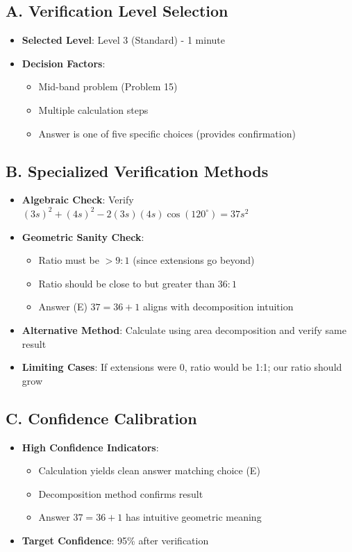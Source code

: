 \documentclass[11pt]{article}
\begin{document}
\begin{verificationbox}
\subsection*{A. Verification Level Selection}
\begin{itemize}[leftmargin=*]
    \item \textbf{Selected Level}: Level 3 (Standard) - 1 minute
    \item \textbf{Decision Factors}:
    \begin{itemize}
        \item Mid-band problem (Problem 15)
        \item Multiple calculation steps
        \item Answer is one of five specific choices (provides confirmation)
    \end{itemize}
\end{itemize}

\subsection*{B. Specialized Verification Methods}
\begin{itemize}[leftmargin=*]
    \item \textbf{Algebraic Check}: Verify $(3s)^2 + (4s)^2 - 2(3s)(4s)\cos(120^{\circ}) = 37s^2$
    \item \textbf{Geometric Sanity Check}: 
    \begin{itemize}
        \item Ratio must be $> 9:1$ (since extensions go beyond)
        \item Ratio should be close to but greater than $36:1$
        \item Answer (E) $37 = 36 + 1$ aligns with decomposition intuition
    \end{itemize}
    \item \textbf{Alternative Method}: Calculate using area decomposition and verify same result
    \item \textbf{Limiting Cases}: If extensions were 0, ratio would be 1:1; our ratio should grow
\end{itemize}

\subsection*{C. Confidence Calibration}
\begin{itemize}[leftmargin=*]
    \item \textbf{High Confidence Indicators}:
    \begin{itemize}
        \item Calculation yields clean answer matching choice (E)
        \item Decomposition method confirms result
        \item Answer $37 = 36 + 1$ has intuitive geometric meaning
    \end{itemize}
    \item \textbf{Target Confidence}: 95\% after verification
\end{itemize}
\end{verificationbox}
\end{document}
